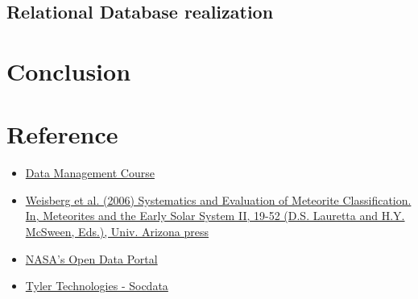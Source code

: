 \documentclass[conference]{IEEEtran}
\begin{document}
	\subsection{Relational Database realization}

	\section{Conclusion}
	
	\section{Reference}
	\begin{itemize}
		\item \href{https://www.diag.uniroma1.it/~lenzerin/index.html/?q=node/53}{Data Management Course}
		\item \href{https://web.pdx.edu/~ruzickaa/meteorites/papers/WeisbergEtal2006-classification.pdf}{Weisberg et al. (2006) Systematics and Evaluation of Meteorite Classification. In, Meteorites and the Early Solar System II, 19-52 (D.S. Lauretta and H.Y. McSween, Eds.), Univ. Arizona press}
		\item \href{https://data.nasa.gov/Space-Science/Meteorite-Landings/gh4g-9sfh/about_data}{NASA's Open Data Portal}
		\item \href{https://dev.socrata.com/docs/datatypes/location.html#}{Tyler Technologies - Socdata}
	\end{itemize}
	
	
	
	
	
\end{document}
